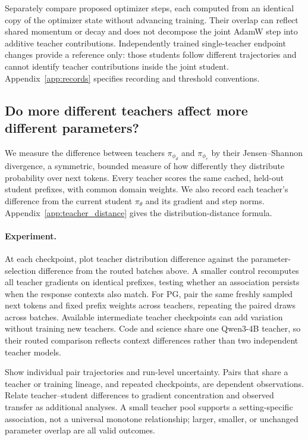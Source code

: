 Separately compare proposed optimizer steps, each computed from an
identical copy of the optimizer state without advancing training. Their
overlap can reflect shared momentum or decay and does not decompose the
joint AdamW step into additive teacher contributions. Independently trained
single-teacher endpoint changes provide a reference only: those students
follow different trajectories and cannot identify teacher contributions
inside the joint student. Appendix~\ref{app:records} specifies recording
and threshold conventions.

\subsection{Do more different teachers affect more different parameters?}

We measure the difference between teachers $\pi_{\phi_d}$ and
$\pi_{\phi_e}$ by their Jensen--Shannon divergence, a symmetric, bounded
measure of how differently they distribute probability over next tokens.
Every teacher scores the same cached, held-out student prefixes, with
common domain weights. We also record each teacher's difference from the
current student $\pi_\theta$ and its gradient and step norms.
Appendix~\ref{app:teacher_distance} gives the distribution-distance formula.

\paragraph{Experiment.}
At each checkpoint, plot teacher distribution difference against the
parameter-selection difference from the routed batches above. A smaller
control recomputes all teacher gradients on identical prefixes, testing
whether an association persists when the response contexts also match.
For PG, pair the same freshly sampled next tokens and fixed prefix weights
across teachers, repeating the paired draws across batches.
Available intermediate teacher checkpoints can add variation without
training new teachers. Code and science share one Qwen3-4B teacher, so
their routed comparison reflects context differences rather than two
independent teacher models.

Show individual pair trajectories and run-level uncertainty. Pairs that
share a teacher or training lineage, and repeated checkpoints, are
dependent observations. Relate teacher--student differences to gradient
concentration and observed transfer as additional analyses. A small
teacher pool supports a setting-specific association, not a universal
monotone relationship; larger, smaller, or unchanged parameter overlap
are all valid outcomes.
